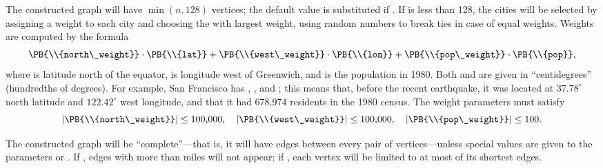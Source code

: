 The constructed graph will have $\min(n,128)$ vertices; the default value
 is substituted if . If  is less
than 128, the  cities will be selected by assigning a weight to
each city and choosing the  with largest weight, using random
numbers to break ties in case of equal weights. Weights are computed
by the formula
$$ \PB{\\{north\_weight}}\cdot\PB{\\{lat}}+\PB{\\{west\_weight}}\cdot\PB{%
\\{lon}}+\PB{\\{pop\_weight}}\cdot\PB{\\{pop}}, $$
where  is latitude north of the equator,  is longitude
west of Greenwich, and  is the population in 1980. Both  and 
are given in ``centidegrees'' (hundredths of degrees). For example,
San Francisco has , , and %
;
this means that, before the recent earthquake, it was located at
$37.78^\circ$ north latitude and $122.42^\circ$ west longitude, and that it had
678,974 residents in the 1980 census. The weight parameters must satisfy
$$ \vert\PB{\\{north\_weight}}\vert\le100{,}000,\quad
\vert\PB{\\{west\_weight}}\vert\le100{,}000,\quad
\vert\PB{\\{pop\_weight}}\vert\le100.$$

The constructed graph will be ``complete''---that is, it will have
edges between every pair of vertices---unless special values are given to
the parameters
 or . If , edges with more
than  miles will not appear; if , each
vertex will be limited to at most  of its shortest edges.

